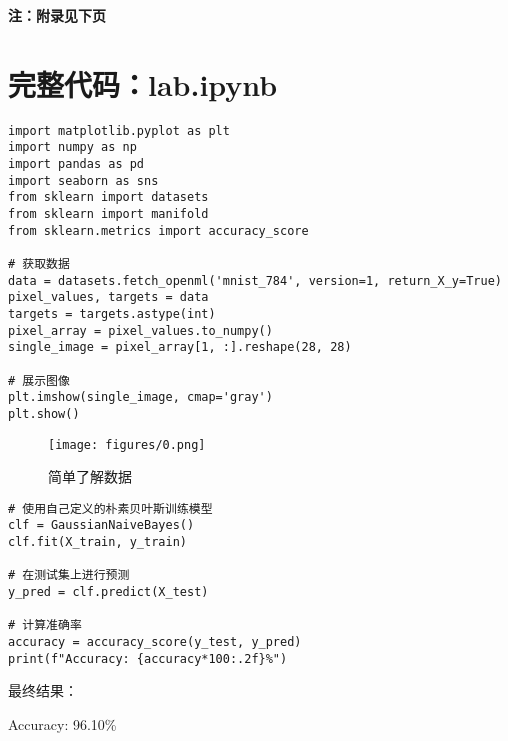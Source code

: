 \documentclass[12pt]{article}
\begin{document}
\vspace*{\fill}
\begin{center}
    \textbf{注：附录见下页}
\end{center}
\vspace*{\fill}

\clearpage  %

\newpage
\appendix

\section*{完整代码：lab.ipynb}
\begin{verbatim}
import matplotlib.pyplot as plt
import numpy as np
import pandas as pd
import seaborn as sns
from sklearn import datasets
from sklearn import manifold
from sklearn.metrics import accuracy_score

# 获取数据
data = datasets.fetch_openml('mnist_784', version=1, return_X_y=True)
pixel_values, targets = data
targets = targets.astype(int)
pixel_array = pixel_values.to_numpy()
single_image = pixel_array[1, :].reshape(28, 28)

# 展示图像
plt.imshow(single_image, cmap='gray')
plt.show()
\end{verbatim}

\begin{figure}[H]
    \centering
    \hspace*{-1.4cm}
    \texttt{[image: figures/0.png]}
    \caption{简单了解数据}
    \label{fig:your_label}
\end{figure}

\begin{verbatim}
# 使用自己定义的朴素贝叶斯训练模型
clf = GaussianNaiveBayes()
clf.fit(X_train, y_train)

# 在测试集上进行预测
y_pred = clf.predict(X_test)

# 计算准确率
accuracy = accuracy_score(y_test, y_pred)
print(f"Accuracy: {accuracy*100:.2f}%")
\end{verbatim}

最终结果：

Accuracy: 96.10\%
\end{document}
